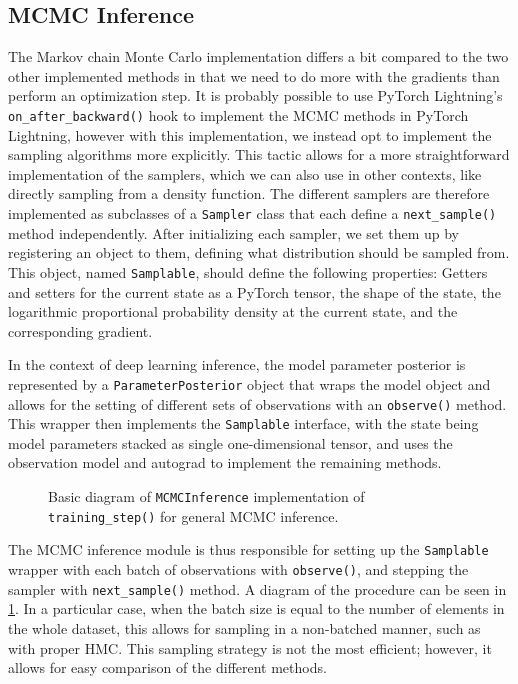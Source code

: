\subsection{MCMC Inference}
The Markov chain Monte Carlo implementation differs a bit compared to the two other implemented methods in that we need to do more with the gradients than perform an optimization step. 
It is probably possible to use PyTorch Lightning's \texttt{on\_after\_backward()} hook to implement the MCMC methods in PyTorch Lightning, however with this implementation, we instead opt to implement the sampling algorithms more explicitly.
This tactic allows for a more straightforward implementation of the samplers, which we can also use in other contexts, like directly sampling from a density function.
The different samplers are therefore implemented as  subclasses of a \texttt{Sampler} class that each define a \texttt{next\_sample()} method independently.
After initializing each sampler, we set them up by registering an object to them, defining what distribution should be sampled from. 
This object, named \texttt{Samplable}, should define the following properties: Getters and setters for the current state as a PyTorch tensor, the shape of the state, the logarithmic proportional probability density at the current state, and the corresponding gradient.  

In the context of deep learning inference, the model parameter posterior is represented by a \texttt{ParameterPosterior} object that wraps the model object and allows for the setting of different sets of observations with an \texttt{observe()} method.
This wrapper then implements the \texttt{Samplable} interface, with the state being model parameters stacked as single one-dimensional tensor, and uses the observation model and autograd to implement the remaining methods.
\begin{figure}[htbp]
    \centering
    
    \caption{Basic diagram of \texttt{MCMCInference} implementation of \texttt{training\_step()} for general MCMC inference.}
    \label{fig:mcmc-arch}
\end{figure}
The MCMC inference module is thus responsible for setting up the \texttt{Samplable} wrapper with each batch of observations with \texttt{observe()}, and stepping the sampler with \texttt{next\_sample()} method. 
A diagram of the procedure can be seen in \cref{fig:mcmc-arch}.
In a particular case, when the batch size is equal to the number of elements in the whole dataset, this allows for sampling in a non-batched manner, such as with proper HMC.
This sampling strategy is not the most efficient; however, it allows for easy comparison of the different methods.

